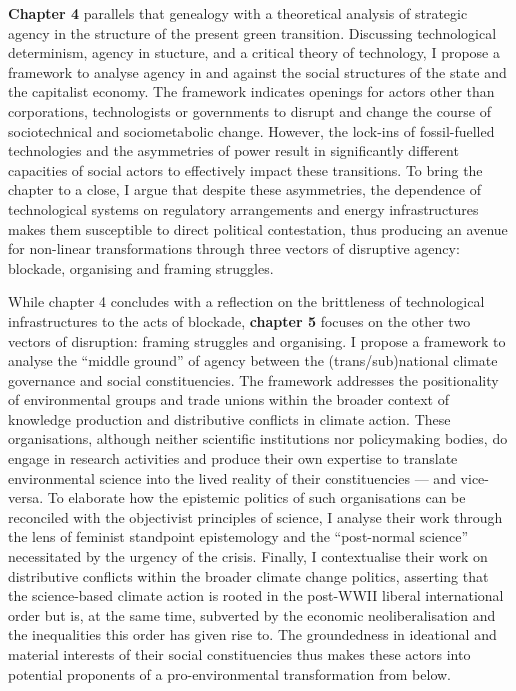 \documentclass[a4paper, nobind]{templates/ociamthesis}
\begin{document}
\textbf{Chapter 4} parallels that genealogy with a theoretical analysis of strategic agency in the structure of the present green transition. Discussing technological determinism, agency in stucture, and a critical theory of technology, I propose a framework to analyse agency in and against the social structures of the state and the capitalist economy. The framework indicates openings for actors other than corporations, technologists or governments to disrupt and change the course of sociotechnical and sociometabolic change. However, the lock-ins of fossil-fuelled technologies and the asymmetries of power result in significantly different capacities of social actors to effectively impact these transitions. To bring the chapter to a close, I argue that despite these asymmetries, the dependence of technological systems on regulatory arrangements and energy infrastructures makes them susceptible to direct political contestation, thus producing an avenue for non-linear transformations through three vectors of disruptive agency: blockade, organising and framing struggles.

While chapter 4 concludes with a reflection on the brittleness of technological infrastructures to the acts of blockade, \textbf{chapter 5} focuses on the other two vectors of disruption: framing struggles and organising. I propose a framework to analyse the ``middle ground'' of agency between the (trans/sub)national climate governance and social constituencies. The framework addresses the positionality of environmental groups and trade unions within the broader context of knowledge production and distributive conflicts in climate action. These organisations, although neither scientific institutions nor policymaking bodies, do engage in research activities and produce their own expertise to translate environmental science into the lived reality of their constituencies --- and vice-versa. To elaborate how the epistemic politics of such organisations can be reconciled with the objectivist principles of science, I analyse their work through the lens of feminist standpoint epistemology and the ``post-normal science'' necessitated by the urgency of the crisis. Finally, I contextualise their work on distributive conflicts within the broader climate change politics, asserting that the science-based climate action is rooted in the post-WWII liberal international order but is, at the same time, subverted by the economic neoliberalisation and the inequalities this order has given rise to. The groundedness in ideational and material interests of their social constituencies thus makes these actors into potential proponents of a pro-environmental transformation from below.
\end{document}
